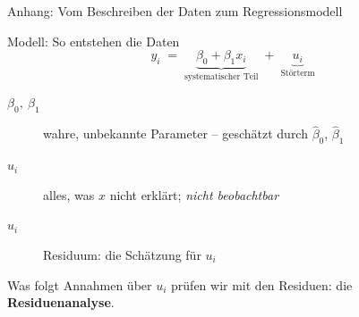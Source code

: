 \documentclass[aspectratio=169,11pt]{beamer}
\begin{document}
\begin{frame}{Anhang: Vom Beschreiben der Daten zum Regressionsmodell}
  \begin{block}{Modell: So entstehen die Daten}
    \vspace{-4pt}
    \[
      y_i \;=\; \underbrace{\beta_0 + \beta_1 x_i}_{\text{systematischer Teil}}
             \;+\; \underbrace{u_i}_{\text{Störterm}}
    \]
    \vspace{-8pt}
    \begin{description}
      \item[$\beta_0,\ \beta_1$] wahre, unbekannte Parameter -- geschätzt durch $\hat{\beta}_0$, $\hat{\beta}_1$
      \item[$u_i$] alles, was $x$ nicht erklärt; \emph{nicht beobachtbar}
      \item[$\hat{u}_i$] Residuum: die Schätzung für $u_i$
    \end{description}
  \end{block}

  \medskip

  \begin{exampleblock}{Was folgt}
    Annahmen über $u_i$ prüfen wir mit den Residuen: die \textbf{Residuenanalyse}.
  \end{exampleblock}
\end{frame}
\end{document}
